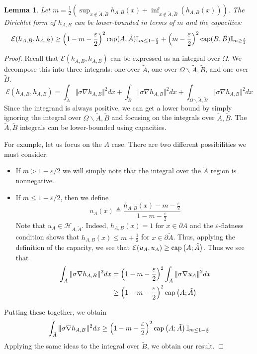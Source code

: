 \documentclass[english, aip, jcp, priprint, graphicx,floatfix]{revtex4-1}
\newcommand{\tmop}[1]{\ensuremath{\operatorname{#1}}}
\newtheorem{lemma}{Lemma}
\theoremstyle{plain}
\theoremstyle{definition}
\theoremstyle{plain}
\begin{document}

\begin{lemma}  Let $m = \frac{1}{2} (\sup_{x \notin \tilde A,\tilde B} h_{A,B} (x) + \inf_{x \notin \tilde A,\tilde B} (h_{A,B} (x)))$.  The Dirichlet form of $h_{A,B}$ can be lower-bounded in terms of $m$ and the capacities:
\[\mathcal{E} (h_{A,B}, h_{A,B}) \geq  
   \left( 1 - m - \frac{\varepsilon}{2} \right)^2 \tmop{cap} (A,\tilde{A}) \indicatorf{m\leq 1-\frac{\varepsilon}{2}} + 
   \left( m- \frac{\varepsilon}{2} \right)^2 \tmop{cap} (B, \tilde{B})\indicatorf{m\geq \frac{\varepsilon}{2}} 
\]
\end{lemma}
\begin{proof}
Recall that $\mathcal{E} (h_{A,B}, h_{A,B})$ can be expressed as an integral over $\Omega$.  We decompose this into three integrals: one over $\tilde A$, one over $\Omega \backslash \tilde A,\tilde B$, and one over $\tilde B$.  
\[
\mathcal{E} (h_{A,B}, h_{A,B}) = \int_{\tilde A} \Vert \sigma \nabla h_{A,B}\Vert^2 dx
                                 + \int_{\tilde B} \Vert \sigma \nabla h_{A,B}\Vert^2 dx
                                 + \int_{\Omega \backslash \tilde A,\tilde B} \Vert \sigma \nabla h_{A,B}\Vert^2 dx
\]
Since the integrand is always positive, we can get a lower bound by simply ignoring the integral over $\Omega \backslash \tilde A,\tilde B$ and focusing on the integrals over $\tilde A,\tilde B$.  The $\tilde A,\tilde B$ integrals can be lower-bounded using capacities.  

For example, let us focus on the $A$ case.  There are two different possibilities we must consider:
\begin{itemize}
\item If $m>1-\varepsilon/2$ we will simply note that the integral over the $\tilde A$ region is nonnegative.  
\item If $m\leq 1-\varepsilon/2$, then we define
    \[
    u_A (x) \triangleq \frac{h_{A,B} (x) - m - \frac{\varepsilon}{2}}{1 - m - \frac{\varepsilon}{2}}
    \]
    Note that $u_A \in \mathcal H_{A,\tilde A}$.  Indeed, $h_{A,B}(x)=1$ for $x \in \partial A$ and the $\varepsilon$-flatness condition shows that $h_{A,B}(x) \leq m + \frac {1}{2}$ for $x \in \partial \tilde A$.  Thus, applying the definition of the capacity, we see that $\mathcal{E}(u_A,u_A) \geq \mathrm{cap}\left(A;\tilde A\right)$.  Thus we see that
    \begin{align*}
    \int_{\tilde A} \Vert \sigma \nabla h_{A,B}\Vert^2 dx &= \left(1 - m - \frac{\varepsilon}{2}\right)^2 \int_{\tilde A} \Vert \sigma \nabla u_{A}\Vert^2 dx\\
         &\geq \left(1 - m - \frac{\varepsilon}{2}\right)^2 \mathrm{cap}\left(A;\tilde A\right)
    \end{align*}
\end{itemize}
Putting these together, we obtain
\[
\int_{\tilde A} \Vert \sigma \nabla h_{A,B}\Vert^2 dx \geq \left(1 - m - \frac{\varepsilon}{2}\right)^2 \mathrm{cap}\left(A;\tilde A\right)\mathbb{I}_{m\leq 1-\frac{\varepsilon}{2}}
\]
Applying the same ideas to the integral over $\tilde B$, we obtain our result.
\end{proof}
\end{document}
